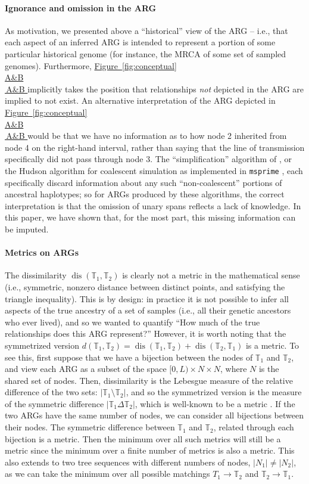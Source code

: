\documentclass[10pt,twoside,lineno]{gsajnl}
\newcommand{\T}{\mathbb{T}}
\newcommand{\msprime}{\texttt{msprime}}
\newcommand{\dis}{\operatorname{dis}}
\newcommand*{\figref}[2][]{%
	\hyperref[{#2}]{%
		Figure~\ref*{#2}%
		\ifx\\#1\\%
		\else
		\,#1%
		\fi
	}%
}
\begin{document}
\paragraph{Ignorance and omission in the ARG}
As motivation, we presented above a ``historical'' view of the ARG --
i.e., that each aspect of an inferred ARG is intended to represent
a portion of some particular historical genome
(for instance, the MRCA of some set of sampled genomes).
Furthermore, \figref[A\&B]{fig:conceptual} implicitly takes the position
that relationships \emph{not} depicted in the ARG are implied to not exist.
An alternative interpretation
of the ARG depicted in \figref[A\&B]{fig:conceptual} would be that we have no information as to 
how node 2 inherited from node 4 on the right-hand interval,
rather than saying that the line of transmission specifically did not pass
through node 3.
The ``simplification'' algorithm of \citet{kelleher2018efficient},
or the Hudson algorithm for coalescent simulation
as implemented in \msprime{} \citep{kelleher2016efficient},
each specifically discard information about any such ``non-coalescent'' portions of ancestral haplotypes;
so for ARGs produced by these algorithms, the correct interpretation is that
the omission of unary spans reflects a lack of knowledge.
In this paper, we have shown that, for the most part, this missing information can be imputed.

\paragraph{Metrics on ARGs}
The dissimilarity $\dis(\T_1,\T_2)$ is clearly not a metric in the mathematical sense
(i.e., symmetric, nonzero distance between distinct points, and satisfying the triangle inequality).
This is by design: in practice it is not possible to infer all aspects
of the true ancestry of a set of samples (i.e., all their genetic ancestors who ever lived),
and so we wanted to quantify
``How much of the true relationships does this ARG represent?''
However, it is worth noting that the symmetrized version
$d(\T_1,\T_2) = \dis(\T_1,\T_2) + \dis(\T_2, \T_1)$ is a metric.
To see this, first suppose that we have a bijection between the nodes of $\T_1$ and $\T_2$,
and view each ARG as a subset of the space $[0,L) \times N \times N$,
where $N$ is the shared set of nodes.
Then, dissimilarity is the Lebesgue measure of the relative difference of the two sets:
$|\T_1 \setminus \T_2|$,
and so the symmetrized version is the measure of the symmetric difference
$|\T_1\Delta\T_2|$,
which is well-known to be a metric \citep{rudin1976principles}. 
If the two ARGs have the same number of nodes,
we can consider all bijections between their nodes.
The symmetric difference between $\T_1$ and $\T_2$,
related through each bijection is a metric.
Then the minimum over all such metrics will still be a metric
since the minimum over a finite number of metrics is also a metric.
This also extends to two tree sequences with different numbers of nodes,
$|N_1|\neq|N_2|$, as we can take the minimum over all possible matchings $T_1\to\T_2$ and $\T_2\to\T_1$.
\end{document}
